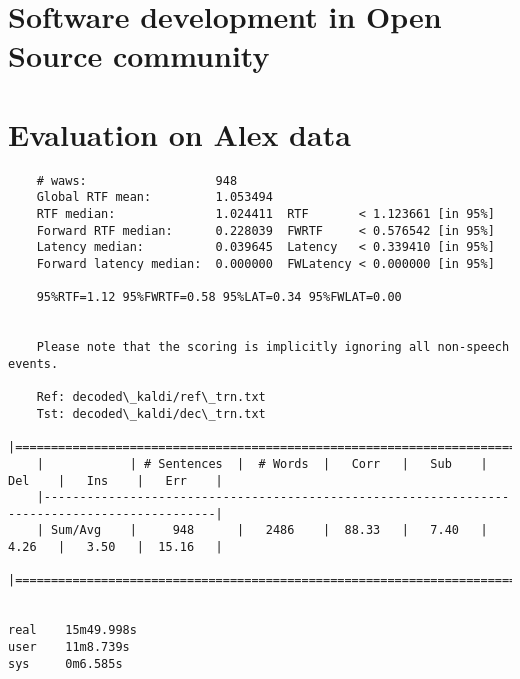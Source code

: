 

\section{Software development in Open Source community} 
\label{sec:software_development_in_open_source_community}

\section{Evaluation on Alex data}
\label{sec:evalution}
\begin{verbatim}
    # waws:                  948
    Global RTF mean:         1.053494
    RTF median:              1.024411  RTF       < 1.123661 [in 95%]
    Forward RTF median:      0.228039  FWRTF     < 0.576542 [in 95%]
    Latency median:          0.039645  Latency   < 0.339410 [in 95%]
    Forward latency median:  0.000000  FWLatency < 0.000000 [in 95%]
    
    95%RTF=1.12 95%FWRTF=0.58 95%LAT=0.34 95%FWLAT=0.00


    Please note that the scoring is implicitly ignoring all non-speech events.
    
    Ref: decoded\_kaldi/ref\_trn.txt
    Tst: decoded\_kaldi/dec\_trn.txt
    |==============================================================================================|
    |            | # Sentences  |  # Words  |   Corr   |   Sub    |   Del    |   Ins    |   Err    |
    |----------------------------------------------------------------------------------------------|
    | Sum/Avg    |     948      |   2486    |  88.33   |   7.40   |   4.26   |   3.50   |  15.16   |
    |==============================================================================================|
    

real    15m49.998s
user    11m8.739s
sys     0m6.585s
\end{verbatim}

